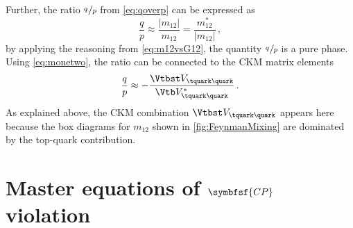 Further, the ratio $\nicefrac{q\,}{p}$ from \cref{eq:qoverp} can be expressed as
\begin{equation}
\frac{q}{p}\approx\frac{\left|m_{12}\right|}{m_{12}}=\frac{m_{12}^\ast}{\left|m_{12}\right|}\,,\label{eq:qoverPPurePhase}
\end{equation}
by applying the reasoning from \cref{eq:m12vsG12}, \ie the quantity $\nicefrac{q\,}{p}$ is a pure phase.
Using \cref{eq:monetwo}, the ratio can be connected to the CKM matrix elements
\begin{equation}
\frac{q}{p}\approx-\frac{\Vtbst V_{\tquark\quark}}{\Vtb V_{\tquark\quark}^\ast}\label{eq:qoverpCKM}\,.
\end{equation}
As explained above, the CKM combination $\Vtbst V_{\tquark\quark}$ appears here because the box diagrams for $m_{12}$ shown in \cref{fig:FeynmanMixing} are dominated by the top-quark contribution.

\newpage

\section[head={Master equations of \CP violation},tocentry={Master equations of \CP violation}]{Master equations of $\symbfsf{C{}P}$ violation}
\label{sec:formulaeCPV}

